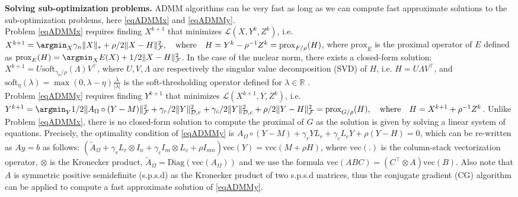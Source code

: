 \documentclass{article}
\begin{document}
{\bf Solving sub-optimization problems.} ADMM algorithms can be very fast as long as we can compute fast approximate solutions to the sub-optimization problems, here \eqref{eqADMMx} and \eqref{eqADMMy}. \\
Problem \eqref{eqADMMx} requires finding $X^{k+1}$ that minimizes $\mathcal{L}(X,Y^k,Z^k)$, i.e. $X^{k+1} = \argmin_X \gamma_n \|X\|_* + \rho/2 \|X-H\|_\mathcal{F}^2,\quad \textrm{where}\quad H=Y^k-\rho^{-1}Z^k=\textrm{prox}_{ F/\rho } (H)$, where $\textrm{prox}_E$ is the proximal operator of $E$ defined as $\textrm{prox}_E(H)=\argmin_X E(X) + 1/2 \|X-H\|_\mathcal{F}^2$. In the case of the nuclear norm, there exists a closed-form solution: $X^{k+1} = U \textrm{soft}_{\gamma_n/\rho}(\Lambda) V^\top$, where $U,V,\Lambda$ are respectively the singular value decomposition (SVD) of $H$, i.e. $H=U \Lambda V^\top$, and $\textrm{soft}_\eta(\lambda)=\max(0,\lambda-\eta)\frac{\lambda}{|\lambda|}$ is the soft-thresholding operator defined for $\lambda\in\mathbb{R}$ \cite{cai2010singular}.\\
Problem \eqref{eqADMMy} requires finding $Y^{k+1}$ that minimizes $\mathcal{L}(X^{k+1},Y,Z^k)$, i.e. $Y^{k+1} = \argmin_Y 1/2\|A_\Omega \circ (Y-M)\|_\mathcal{F}^2 + \gamma_r/2 \|Y\|^2_{\mathcal{D},r} + \gamma_c/2 \|Y\|^2_{\mathcal{D},c} + \rho/2 \|Y-H\|_\mathcal{F}^2 = \textrm{prox}_{ G/\rho } (H),\quad \textrm{where}\quad H=X^{k+1}+\rho^{-1}Z^k$. Unlike Problem \eqref{eqADMMx}, there is no closed-form solution to compute the proximal of $G$ as the solution is given by solving a linear system of equations. Precisely, the optimality condition of \eqref{eqADMMy} is $A_\Omega \circ (Y-M) + \gamma_r Y L_r + \gamma_c L_c Y + \rho (Y - H) = 0$, which can be re-written as $Ay=b$ as follows: $( \tilde{A}_\Omega + \gamma_r   L_r \otimes I_n + \gamma_c  I_m \otimes L_c + \rho I_{mn} ) \textrm{vec}(Y) = \textrm{vec} ( M + \rho H )$, where $\textrm{vec}(.)$ is the column-stack vectorization operator, $\otimes$ is the Kronecker product, $\tilde{A}_\Omega=\textrm{Diag}(\textrm{vec}(A_\Omega))$ and we use the formula $\textrm{vec}(ABC) = (C^\top \otimes A) \textrm{vec}(B)$. Also note that $A$ is symmetric positive semidefinite (s.p.s.d) as the Kronecker product of two s.p.s.d matrices, thus the conjugate gradient (CG) algorithm can be applied to compute a fast approximate solution of \eqref{eqADMMy}.

\end{document}
